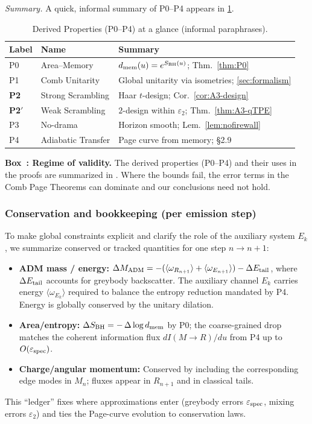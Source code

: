 \documentclass[11pt,a4paper]{article}
\newcommand{\Ptwo}{\textbf{P2}\xspace}
\newcommand{\PtwoPrime}{\textbf{P2$'$}\xspace}
\newcounter{boxedresult}
\newenvironment{boxedresult}[1]{\refstepcounter{boxedresult}\begin{infobox}\noindent\textbf{Box~\theboxedresult: #1.}}{\end{infobox}}
\theoremstyle{plain}
\theoremstyle{definition}
\theoremstyle{remark}
\begin{document}
\noindent\emph{Summary.} A quick, informal summary of P0--P4 appears in \cref{tab:postulates_glance}.

\begin{table}[htbp]
\centering
\caption{Derived Properties (P0--P4) at a glance (informal paraphrases).}
\label{tab:postulates_glance}
\footnotesize
\begin{tabular*}{\textwidth}{@{\extracolsep{\fill}}lll@{}}
\toprule
\textbf{Label} & \textbf{Name} & \textbf{Summary}\\
\midrule
P0 & Area--Memory & $d_{\rm mem}(u)=e^{S_{\rm BH}(u)}$; Thm.~\ref{thm:P0}\\
P1 & Comb Unitarity & Global unitarity via isometries; \cref{sec:formalism}\\
\Ptwo & Strong Scrambling & Haar $t$-design; Cor.~\ref{cor:A3-design}\\
\PtwoPrime & Weak Scrambling & $2$-design within $\varepsilon_2$; Thm.~\ref{thm:A3-qTPE}\\
P3 & No-drama & Horizon smooth; Lem.~\ref{lem:nofirewall}\\
P4 & Adiabatic Transfer & Page curve from memory; §2.9\\
\bottomrule
\end{tabular*}
\end{table}
\begin{boxedresult}{Regime of validity}\label{tab:domain_validity}
The derived properties (P0--P4) and their uses in the proofs are summarized in . Where the bounds fail, the error terms in the Comb Page Theorems can dominate and our conclusions need not hold.
\end{boxedresult}

\subsubsection{Conservation and bookkeeping (per emission step)}
To make global constraints explicit and clarify the role of the auxiliary system $E_k$, we summarize conserved or tracked quantities for one step $n\!\to\!n{+}1$:
\begin{itemize}[leftmargin=*]
  \item \textbf{ADM mass / energy:} $\Delta M_{\rm ADM} = -(\langle \omega_{R_{n+1}}\rangle + \langle \omega_{E_{n+1}}\rangle) - \Delta E_{\rm tail}$, where $\Delta E_{\rm tail}$ accounts for greybody backscatter. The auxiliary channel $E_k$ carries energy $\langle \omega_{E_{k}}\rangle$ required to balance the entropy reduction mandated by P4. Energy is globally conserved by the unitary dilation.
  \item \textbf{Area/entropy:} $\Delta S_{\rm BH} = -\,\Delta \log d_{\rm mem}$ by P0; the coarse-grained drop matches the coherent information flux $dI(M\!\to\!R)/du$ from P4 up to $O(\varepsilon_{\rm spec})$.
  \item \textbf{Charge/angular momentum:} Conserved by including the corresponding edge modes in $M_n$; fluxes appear in $R_{n+1}$ and in classical tails.
\end{itemize}
This ``ledger'' fixes where approximations enter (greybody errors $\varepsilon_{\rm spec}$, mixing errors $\varepsilon_2$) and ties the Page-curve evolution to conservation laws.
\end{document}
